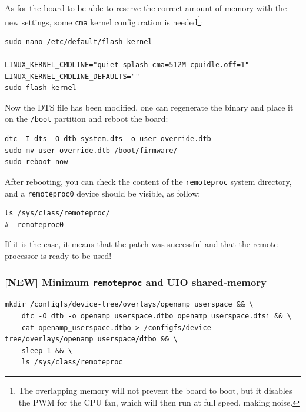 \documentclass[10pt]{article}
\begin{document}
As for the board to be able to reserve the correct amount of memory with the new settings, some
\texttt{cma} kernel configuration is needed\footnote{The overlapping memory will not prevent the board to boot,
but it disables the PWM for the CPU fan, which will then run at full speed, making noise.}:

\begin{verbatim}
sudo nano /etc/default/flash-kernel

LINUX_KERNEL_CMDLINE="quiet splash cma=512M cpuidle.off=1"
LINUX_KERNEL_CMDLINE_DEFAULTS=""
sudo flash-kernel
\end{verbatim}

Now the DTS file has been modified, one can regenerate the binary and place it on the \texttt{/boot} partition
and reboot the board:

\begin{verbatim}
dtc -I dts -O dtb system.dts -o user-override.dtb
sudo mv user-override.dtb /boot/firmware/
sudo reboot now
\end{verbatim}

After rebooting, you can check the content of the \verb|remoteproc| system directory,
and a \texttt{remoteproc0} device should be visible, as follow:

\begin{verbatim}
ls /sys/class/remoteproc/
#  remoteproc0
\end{verbatim}

If it is the case, it means that the patch was successful and  that the remote processor is
ready to be used!
\pagebreak

\subsubsection{[NEW] Minimum \texttt{remoteproc} and UIO shared-memory}
\label{sec:org1e8b6b2}
\begin{verbatim}
mkdir /configfs/device-tree/overlays/openamp_userspace && \
    dtc -O dtb -o openamp_userspace.dtbo openamp_userspace.dtsi && \
    cat openamp_userspace.dtbo > /configfs/device-tree/overlays/openamp_userspace/dtbo && \
    sleep 1 && \
    ls /sys/class/remoteproc
\end{verbatim}
\end{document}
